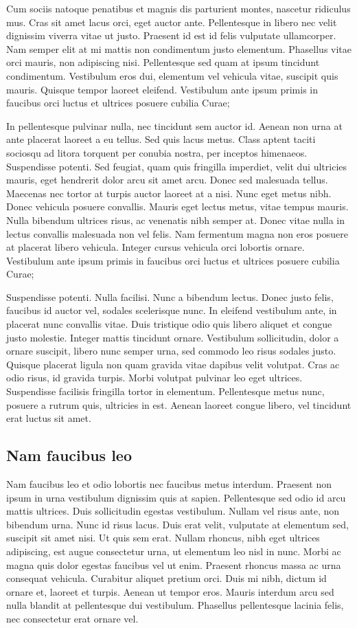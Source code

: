 Cum sociis natoque penatibus et magnis dis parturient montes, nascetur ridiculus mus.
Cras sit amet lacus orci, eget auctor ante.
Pellentesque in libero nec velit dignissim viverra vitae ut justo.
Praesent id est id felis vulputate ullamcorper.
Nam semper elit at mi mattis non condimentum justo elementum.
Phasellus vitae orci mauris, non adipiscing nisi.
Pellentesque sed quam at ipsum tincidunt condimentum.
Vestibulum eros dui, elementum vel vehicula vitae, suscipit quis mauris.
Quisque tempor laoreet eleifend.
Vestibulum ante ipsum primis in faucibus orci luctus et ultrices posuere cubilia Curae;

In pellentesque pulvinar nulla, nec tincidunt sem auctor id.
Aenean non urna at ante placerat laoreet a eu tellus.
Sed quis lacus metus.
Class aptent taciti sociosqu ad litora torquent per conubia nostra, per inceptos himenaeos.
Suspendisse potenti.
Sed feugiat, quam quis fringilla imperdiet, velit dui ultricies mauris, eget hendrerit dolor arcu sit amet arcu.
Donec sed malesuada tellus.
Maecenas nec tortor at turpis auctor laoreet at a nisi.
Nunc eget metus nibh.
Donec vehicula posuere convallis.
Mauris eget lectus metus, vitae tempus mauris.
Nulla bibendum ultrices risus, ac venenatis nibh semper at.
Donec vitae nulla in lectus convallis malesuada non vel felis.
Nam fermentum magna non eros posuere at placerat libero vehicula.
Integer cursus vehicula orci lobortis ornare.
Vestibulum ante ipsum primis in faucibus orci luctus et ultrices posuere cubilia Curae;

Suspendisse potenti.
Nulla facilisi.
Nunc a bibendum lectus.
Donec justo felis, faucibus id auctor vel, sodales scelerisque nunc.
In eleifend vestibulum ante, in placerat nunc convallis vitae.
Duis tristique odio quis libero aliquet et congue justo molestie.
Integer mattis tincidunt ornare.
Vestibulum sollicitudin, dolor a ornare suscipit, libero nunc semper urna, sed commodo leo risus sodales justo.
Quisque placerat ligula non quam gravida vitae dapibus velit volutpat.
Cras ac odio risus, id gravida turpis.
Morbi volutpat pulvinar leo eget ultrices.
Suspendisse facilisis fringilla tortor in elementum.
Pellentesque metus nunc, posuere a rutrum quis, ultricies in est.
Aenean laoreet congue libero, vel tincidunt erat luctus sit amet.

\subsection{Nam faucibus leo}
Nam faucibus leo et odio lobortis nec faucibus metus interdum.
Praesent non ipsum in urna vestibulum dignissim quis at sapien.
Pellentesque sed odio id arcu mattis ultrices.
Duis sollicitudin egestas vestibulum.
Nullam vel risus ante, non bibendum urna.
Nunc id risus lacus.
Duis erat velit, vulputate at elementum sed, suscipit sit amet nisi.
Ut quis sem erat.
Nullam rhoncus, nibh eget ultrices adipiscing, est augue consectetur urna, ut elementum leo nisl in nunc.
Morbi ac magna quis dolor egestas faucibus vel ut enim.
Praesent rhoncus massa ac urna consequat vehicula.
Curabitur aliquet pretium orci.
Duis mi nibh, dictum id ornare et, laoreet et turpis.
Aenean ut tempor eros.
Mauris interdum arcu sed nulla blandit at pellentesque dui vestibulum.
Phasellus pellentesque lacinia felis, nec consectetur erat ornare vel.

